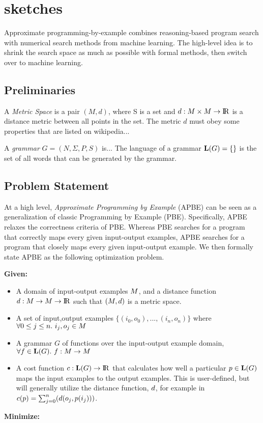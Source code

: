 \section{sketches}

Approximate programming-by-example combines reasoning-based program search with numerical search methods from machine learning.
The high-level idea is to shrink the search space as much as possible with formal methods, then switch over to machine learning.


\subsection{Preliminaries}
A \textit{Metric Space} is a pair $(M,d)$, where S is a set and $d:M \times M \to {\rm I\!R}$ is a distance metric between all points in the set. The metric $d$ must obey some properties that are listed on wikipedia...

A \textit{grammar} $G = (N,\Sigma,P,S)$ is...
The language of a grammar $\mathbf{L}(G) = \{ \}$ is the set of all words that can be generated by the grammar.


\subsection{Problem Statement}
At a high level, \textit{Approximate Programming by Example} (APBE) can be seen as a generalization of classic Programming by Example (PBE).
Specifically, APBE relaxes the correctness criteria of PBE.
Whereas PBE searches for a program that correctly maps every given input-output examples, APBE searches for a program that closely maps every given input-output example.
We then formally state APBE as the following optimization problem.

\noindent\textbf{Given:}
\begin{itemize}[topsep=0pt]
  \item A domain of input-output examples $M$, and a distance function $d:M \to M \to {\rm I\!R}$ such that $(M,{d})$ is a metric space.
  \item A set of input,output examples $\{(i_0,o_0),...,(i_n,o_n)\}$ where $\forall 0 \leq j \leq n.\ i_j,o_j \in M$
  \item A grammar $G$ of functions over the input-output example domain, $\forall f \in \mathbf{L}(G).\ f: M \to M$
  \item A cost function ${c} : \mathbf{L}(G) \to {\rm I\!R}$ that calculates how well a particular $p \in \mathbf{L}(G)$ maps the input examples to the output examples. This is user-defined, but will generally utilize the distance function, ${d}$, for example in ${c}(p) = \sum_{j=0}^{n} ({d}(o_j,p(i_j)))$.
\end{itemize}
\textbf{Minimize:}

